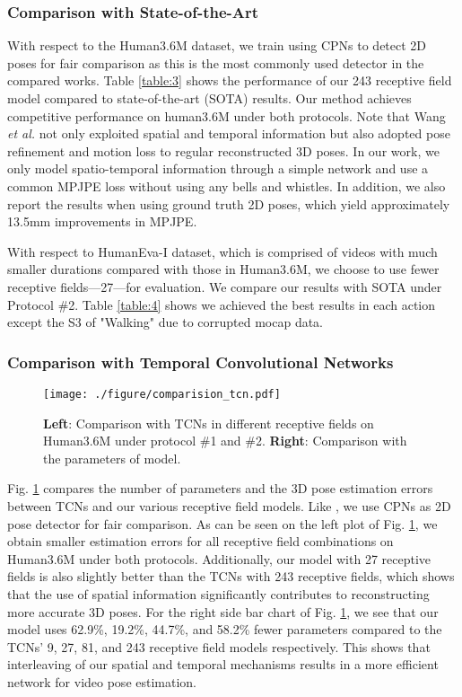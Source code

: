 \documentclass[letterpaper, 10 pt, conference, twoside]{ieeeconf}
\begin{document}
\subsubsection{Comparison with State-of-the-Art}
With respect to the Human3.6M dataset, we train using CPNs \cite{chen2018cascaded} to detect 2D poses for fair comparison as this is the most commonly used detector in the compared works. Table \ref{table:3} shows the performance of our 243 receptive field model compared to state-of-the-art (SOTA) results. Our method achieves competitive performance on human3.6M under both protocols. Note that Wang \emph{et al.} \cite{wang2020motion} not only exploited spatial and temporal information but also adopted pose refinement and motion loss to regular reconstructed 3D poses. In our work, we only model spatio-temporal information through a simple network and use a common MPJPE loss without using any bells and whistles. In addition, we also report the results when using ground truth 2D poses, which yield approximately 13.5mm improvements in MPJPE.

With respect to HumanEva-I dataset, which is comprised of videos with much smaller durations compared with those in Human3.6M, we choose to use fewer receptive fields---27---for evaluation. We compare our results with SOTA under Protocol \#2. Table \ref{table:4} shows we achieved the best results in each action except the S3 of "Walking" due to corrupted mocap data. 
\subsubsection{Comparison with Temporal Convolutional  Networks}
\begin{figure}[t]
	\centering
	\texttt{[image: ./figure/comparision\_tcn.pdf]}
	\caption{\textbf{Left}: Comparison with TCNs \cite{pavllo20193d} in different receptive fields on Human3.6M under protocol \#1 and \#2. \textbf{Right}: Comparison with the parameters of model.}
	\label{fig:comparision_tcns}
\end{figure}
Fig. \ref{fig:comparision_tcns} compares the number of parameters and the 3D pose estimation errors between TCNs \cite{pavllo20193d} and our various receptive field models. Like \cite{pavllo20193d}, we use CPNs as 2D pose detector for fair comparison. As can be seen on the left plot of Fig. \ref{fig:comparision_tcns}, we obtain smaller estimation errors for all receptive field combinations on Human3.6M under both protocols. Additionally, our model with 27 receptive fields is also slightly better than the TCNs with 243 receptive fields, which shows that the use of spatial information significantly contributes to reconstructing more accurate 3D poses. For the right side bar chart of Fig. \ref{fig:comparision_tcns}, we see that our model uses 62.9\%, 19.2\%, 44.7\%, and 58.2\% fewer parameters compared to the TCNs' 9, 27, 81, and 243 receptive field models respectively. This shows that interleaving of our spatial and temporal mechanisms results in a more efficient network for video pose estimation.
\end{document}
